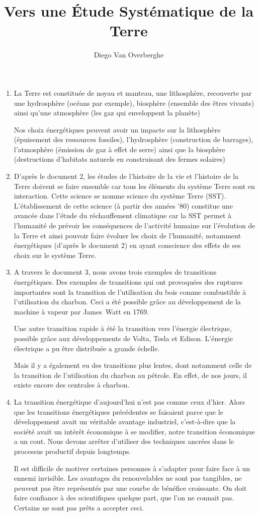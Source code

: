 \documentclass{scrartcl}
\title{Vers une Étude Systématique de la Terre}
\author{Diego Van Overberghe}
\begin{document}
    \maketitle
    \begin{enumerate}
        \item   La Terre est constituée de noyau et manteau, une lithosphère, recouverte par une hydrosphère (océans par exemple), biosphère (ensemble des êtres vivants) ainsi qu'une atmosphère (les gaz qui enveloppent la planète)
        
                Nos choix énergétiques peuvent avoir un impacte sur la lithosphère (épuisement des ressources fossiles), l'hydrosphère (construction de barrages), l'atmosphère (émission de gaz à effet de serre) ainsi que la biosphère (destructions d'habitats naturels en construisant des fermes solaires)
        \item   D'après le document 2, les études de l'histoire de la vie et l'histoire de la Terre doivent se faire ensemble car tous les éléments du système Terre sont en interaction. Cette science se nomme science du système Terre (SST). L'établissement de cette science (à partir des années '80) constitue une avancée dans l'étude du réchauffement climatique car la SST permet à l'humanité de prévoir les conséquences de l'activité humaine sur l'évolution de la Terre et ainsi pouvoir faire évoluer les choix de l'humanité, notamment énergétiques (d'après le document 2) en ayant conscience des effets de ses choix sur le système Terre.
        \item   A travers le document 3, nous avons trois exemples de transitions énergétiques. Des exemples de transitions qui ont provoquées des ruptures importantes sont la transition de l'utilisation du bois comme combustible à l'utilisation du charbon. Ceci a été possible grâce au développement de la machine à vapeur par James~Watt en 1769.
        
        Une autre transition rapide à été la transition vers l'énergie électrique, possible grâce aux développements de Volta, Tesla et Edison. L'énergie électrique a pu être distribuée a grande échelle.

        Mais il y a également eu des transitions plus lentes, dont notamment celle de la transition de l'utilisation du charbon au pétrole. En effet, de nos jours, il existe encore des centrales à charbon.
        \item   La transition énergétique d'aujourd'hui n'est pas comme ceux d'hier. Alors que les transitions énergétiques précédentes se faisaient parce que le développement avait un véritable avantage industriel, c'est-à-dire que la société avait un intérêt économique à se modifier, notre transition économique a un cout. Nous devons arrêter d'utiliser des techniques ancrées dans le processus productif depuis longtemps. 
        
        Il est difficile de motiver certaines personnes à s'adapter pour faire face à un ennemi invisible. Les avantages du renouvelables ne sont pas tangibles, ne peuvent pas être représentés par une courbe de bénéfice croissante. On doit faire confiance à des scientifiques quelque part, que l'on ne connait pas. Certains ne sont pas prêts a accepter ceci.
    \end{enumerate}
\end{document}
